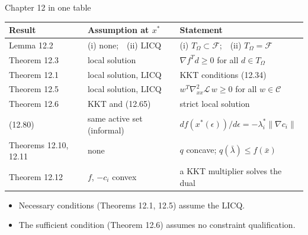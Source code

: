 \documentclass[aspectratio=169,12pt]{beamer}
\newcommand{\xs}{x^{*}}
\newcommand{\gradf}{\nabla f}
\newcommand{\ls}{\lambda^{*}}
\newcommand{\cC}{\mathcal{C}}
\newcommand{\cF}{\mathcal{F}}
\newcommand{\cL}{\mathcal{L}}
\newcommand{\TO}{T_{\Omega}}
\newcommand{\hessL}{\nabla_{xx}^{2}\cL}
\begin{document}
\begin{frame}{Chapter 12 in one table}
  \begin{center}\small\setlength\tabcolsep{5pt}
  \renewcommand{\arraystretch}{1.2}
  \begin{tabular}{lll}
    \toprule
    Result & Assumption at $\xs$ & Statement \\
    \midrule
    Lemma 12.2 & (i) none;\ \ (ii) LICQ & (i) $\TO\subset\cF$;\ \ (ii) $\TO=\cF$ \\
    Theorem 12.3 & local solution & $\gradf^{T}d\ge 0$ for all $d\in\TO$ \\
    Theorem 12.1 & local solution, LICQ & KKT conditions (12.34) \\
    Theorem 12.5 & local solution, LICQ & $w^{T}\hessL\,w\ge 0$ for all $w\in\cC$ \\
    Theorem 12.6 & KKT and (12.65) & strict local solution \\
    (12.80) & same active set (informal) & $df(\xs(\epsilon))/d\epsilon=-\ls_{i}\|\nabla c_{i}\|$ \\
    Theorems 12.10, 12.11 & none & $q$ concave; $q(\bar\lambda)\le f(\bar x)$ \\
    Theorem 12.12 & $f$, $-c_{i}$ convex & a KKT multiplier solves the dual \\
    \bottomrule
  \end{tabular}
  \end{center}
  \begin{itemize}\setlength\itemsep{0.3em}
    \item Necessary conditions (Theorems 12.1, 12.5) assume the LICQ.
    \item The sufficient condition (Theorem 12.6) assumes no constraint qualification.
  \end{itemize}
\end{frame}
\end{document}
